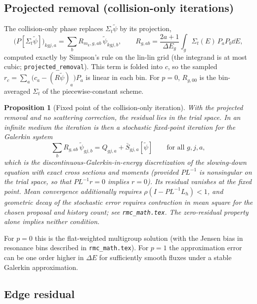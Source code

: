 \documentclass[11pt]{article}
\newtheorem{proposition}{Proposition}
\newcommand{\tpsi}{\tilde\psi}
\newcommand{\Sbar}{\bar S}
\newcommand{\Sigt}{\Sigma_t}
\begin{document}
\subsection{Projected removal (collision-only iterations)}

The collision-only phase replaces $\Sigt\tpsi$ by its projection,
\begin{equation}
  \big(P[\Sigt\tpsi]\big)_{kgj,a} = \sum_b R_{m_k,g,ab}\,\tpsi_{kgj,b},\qquad
  R_{g,ab} = \frac{2a+1}{\Delta E_g}\int_g\Sigt(E)\,P_aP_b\dd E ,
\end{equation}
computed exactly by Simpson's rule on the lin-lin grid (the integrand is at most
cubic; \texttt{projected\_removal}). This term is folded into $c$, so the sampled
$r_c = \sum_a\big(c_a - (R\tpsi)_a\big)P_a$ is linear in each bin. For $p=0$,
$R_{g,00}$ is the bin-averaged $\Sigt$ of the piecewise-constant scheme.

\begin{proposition}[Fixed point of the collision-only iteration]
With the projected removal and no scattering correction, the residual lies in the
trial space. In an infinite medium the iteration is then a stochastic fixed-point
iteration for the Galerkin system
\[
  \sum_b R_{g,ab}\,\tpsi_{gj,b} = Q_{gj,a} + \Sbar_{gj,a}[\tpsi]
  \qquad\text{for all } g, j, a ,
\]
which is the discontinuous-Galerkin-in-energy discretization of the slowing-down
equation with exact cross sections and moments (provided $PL^{-1}$ is nonsingular on
the trial space, so that $PL^{-1}r=0$ implies $r=0$). Its residual vanishes at the
fixed point. Mean convergence additionally requires
$\rho(I-PL^{-1}L_h)<1$, and geometric decay of the stochastic error requires
contraction in mean square for the chosen proposal and history count; see
\texttt{rmc\_math.tex}. The zero-residual property alone implies neither condition.
\end{proposition}

For $p=0$ this is the flat-weighted multigroup solution (with the Jensen bias in
resonance bins described in \texttt{rmc\_math.tex}). For $p=1$ the approximation
error can be one order higher in $\Delta E$ for sufficiently smooth fluxes
under a stable Galerkin approximation.

\subsection{Edge residual}
\end{document}
